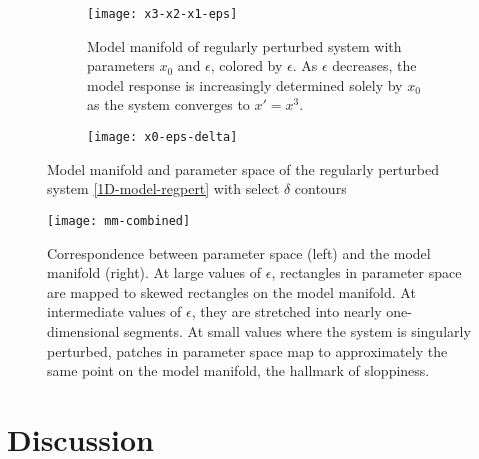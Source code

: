 \begin{figure*}
  \centering
  \begin{subfigure}[t]{0.45\linewidth}
    \centering
    \texttt{[image: x3-x2-x1-eps]}
    \caption{Model manifold of regularly perturbed system with
      parameters $x_0$ and $\epsilon$, colored by $\epsilon$. As
      $\epsilon$ decreases, the model response is increasingly
      determined solely by $x_0$ as the system converges to $x' =
      x^3$. \label{fig:reg-pert} }
  \end{subfigure}
  \hspace{0.5cm}
  \begin{subfigure}[t]{0.45\linewidth}
    \centering
    \texttt{[image: x0-eps-delta]}
  \end{subfigure}
  \caption{Model manifold and parameter space of the regularly
    perturbed system \eqref{1D-model-regpert} with select $\delta$
    contours \label{fig:reg-pert} }
\end{figure*}

\begin{figure*}[ht!]
  \centering
  \texttt{[image: mm-combined]}
  \caption{Correspondence between parameter space (left) and the model manifold (right). At large values of $\epsilon$, rectangles in parameter space are mapped to skewed rectangles on the model manifold. At intermediate values of $\epsilon$, they are stretched into nearly one-dimensional segments. At small values where the system is singularly perturbed, patches in parameter space map to approximately the same point on the model manifold, the hallmark of sloppiness.}
\end{figure*}


\section{Discussion}


